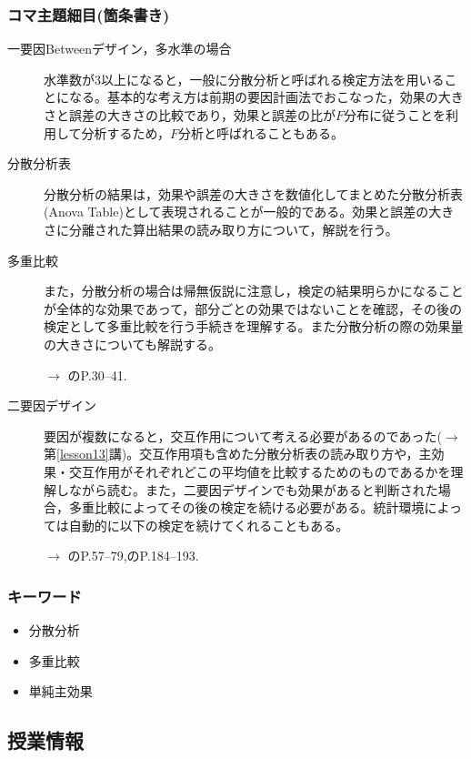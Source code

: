 \subsubsection{コマ主題細目(箇条書き)}
\begin{description}
\item[一要因Betweenデザイン，多水準の場合]水準数が3以上になると，一般に分散分析と呼ばれる検定方法を用いることになる。基本的な考え方は前期の要因計画法でおこなった，効果の大きさと誤差の大きさの比較であり，効果と誤差の比が$F$分布に従うことを利用して分析するため，$F$分析と呼ばれることもある。
\item[分散分析表]分散分析の結果は，効果や誤差の大きさを数値化してまとめた分散分析表(Anova Table)として表現されることが一般的である。効果と誤差の大きさに分離された算出結果の読み取り方について，解説を行う。
\item[多重比較]また，分散分析の場合は帰無仮説に注意し，検定の結果明らかになることが全体的な効果であって，部分ごとの効果ではないことを確認，その後の検定として多重比較を行う手続きを理解する。また分散分析の際の効果量の大きさについても解説する。
\begin{flushright}
    $\to$ \citet{橋本201607} のP.30--41.
\end{flushright}

\item[二要因デザイン]要因が複数になると，交互作用について考える必要があるのであった($\to$第\ref{lesson13}講)。交互作用項も含めた分散分析表の読み取り方や，主効果・交互作用がそれぞれどこの平均値を比較するためのものであるかを理解しながら読む。また，二要因デザインでも効果があると判断された場合，多重比較によってその後の検定を続ける必要がある。統計環境によっては自動的に以下の検定を続けてくれることもある。
\begin{flushright}
    $\to$ \citet{橋本201607} のP.57--79,\citet{Yamada2004}のP.184--193.
\end{flushright}

\end{description}
\subsubsection{キーワード}
\begin{itemize}
\item 分散分析
\item 多重比較
\item 単純主効果
\end{itemize}
\subsection{授業情報}
